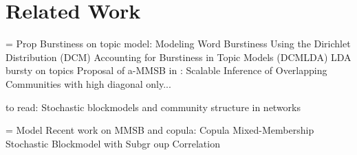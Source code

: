 \section{Related Work}
= Prop
Burstiness on topic model:
Modeling Word Burstiness Using the Dirichlet Distribution (DCM)
Accounting for Burstiness in Topic Models (DCMLDA)
LDA bursty on topics
Proposal of a-MMSB in : Scalable Inference of Overlapping Communities
with high diagonal only...

to read: Stochastic blockmodels and community structure in networks

= Model
Recent work on MMSB and copula: Copula Mixed-Membership Stochastic Blockmodel with Subgr
oup Correlation



